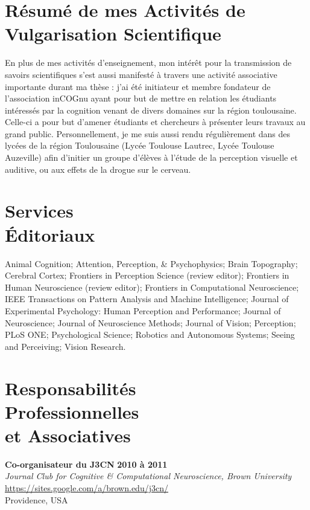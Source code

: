 \documentclass[margin,line]{resume}
\begin{document}
\begin{resume}
\vspace{3mm}
\section{\mysidestyle Résumé de mes Activités de \\Vulgarisation Scientifique}
En plus de mes activités d'enseignement, mon intérêt pour la transmission de savoirs scientifiques s’est aussi manifesté à travers une activité associative importante durant ma thèse : j’ai été initiateur et membre fondateur de l’association inCOGnu ayant pour but de mettre en relation les étudiants intéressés par la cognition venant de divers domaines sur la région toulousaine. Celle-ci a pour but d’amener étudiants et chercheurs à présenter leurs travaux au grand public. Personnellement, je me suis aussi rendu régulièrement dans des lycées de la région Toulousaine (Lycée Toulouse Lautrec, Lycée Toulouse Auzeville) afin d’initier un groupe d’élèves à l’étude de la perception visuelle et auditive, ou aux effets de la drogue sur le cerveau.


\vspace{3mm}
\section{\mysidestyle Services\\\'Editoriaux}
Animal Cognition; 
Attention, Perception, \& Psychophysics; 
Brain Topography;  
Cerebral Cortex; 
Frontiers in Perception Science (review editor); 
Frontiers in Human Neuroscience (review editor); 
Frontiers in Computational Neuroscience; 
IEEE Transactions on Pattern Analysis and Machine Intelligence;
Journal of Experimental Psychology: Human Perception and Performance;
Journal of Neuroscience;
Journal of Neuroscience Methods;
Journal of Vision;
Perception;
PLoS ONE; 
Psychological Science;
Robotics and Autonomous Systems;
Seeing and Perceiving;
Vision Research.


\vspace{3mm}
    \section{\mysidestyle Responsabilités\\ Professionnelles\\ et Associatives}

	\textbf{Co-organisateur du J3CN} \hfill \textbf{2010 à 2011}\\
	\textsl{Journal Club for Cognitive \& Computational Neuroscience, Brown University}\\
	 \url{https://sites.google.com/a/brown.edu/j3cn/}\\
	Providence, USA	


\end{resume}
\end{document}
